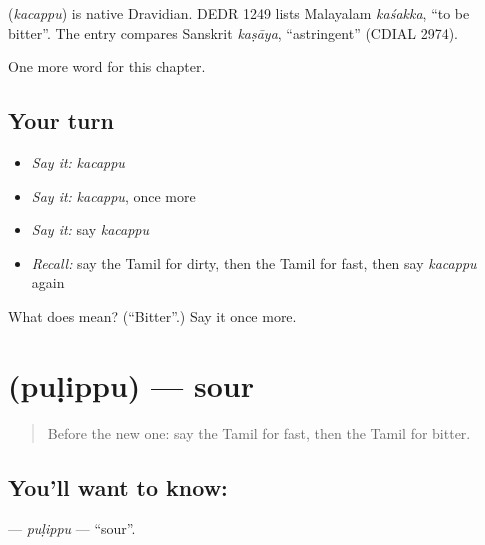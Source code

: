 \begin{cousinweb}
\textbf{} (\emph{kacappu}) is native Dravidian. DEDR 1249 lists Malayalam \emph{kaśakka}, \textquotedblleft{}to be bitter\textquotedblright{}. The entry compares Sanskrit \emph{kaṣāya}, \textquotedblleft{}astringent\textquotedblright{} (CDIAL 2974).
\end{cousinweb}

\begin{grammarlens}[title={What you've built}]
One more word for this chapter.
\end{grammarlens}

\subsection*{Your turn}
\begin{itemize}
\raggedright
  \item \emph{Say it:} \emph{kacappu}
  \item \emph{Say it:} \emph{kacappu}, once more
  \item \emph{Say it:} say \emph{kacappu}
  \item \emph{Recall:} say the Tamil for dirty, then the Tamil for fast, then say \emph{kacappu} again
\end{itemize}

\begin{tcolorbox}[breakable,colback=teal!4,colframe=teal!35!black,title={Before you move on}]
What does  mean? (\textquotedblleft{}Bitter\textquotedblright{}.) Say it once more.
\end{tcolorbox}
\section[\texorpdfstring{\ta{புளிப்பு} (puḷippu)}{புளிப்பு (puḷippu)}]{ (puḷippu) — sour}

\label{lesson:TA-C146-pulippu}



\begin{quote}
Before the new one: say the Tamil for fast, then the Tamil for bitter.
\end{quote}

\subsection*{You'll want to know: }
\textbf{} — \emph{puḷippu} — \textquotedblleft{}sour\textquotedblright{}.

